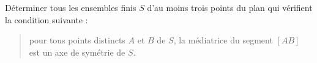 Déterminer tous les ensembles finis $S$ d'au moins trois points du plan qui vérifient la condition suivante :
\begin{quote}
pour tous points distincts $A$ et $B$ de $S$, la médiatrice du segment $[AB]$ est un axe de symétrie de $S$.
\end{quote}
